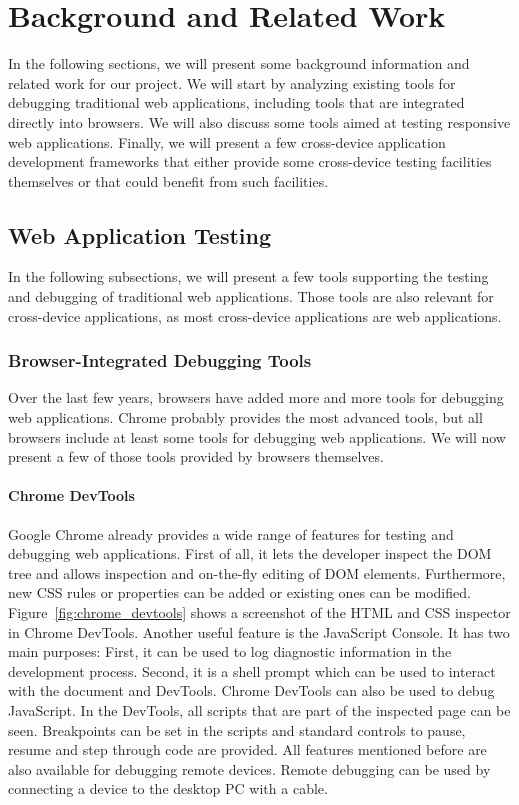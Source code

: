 \chapter{Background and Related Work}

In the following sections, we will present some background information and related work for our project. We will start by analyzing existing tools for debugging traditional web applications, including tools that are integrated directly into browsers. We will also discuss some tools aimed at testing responsive web applications. Finally, we will present a few cross-device application development frameworks that either provide some cross-device testing facilities themselves or that could benefit from such facilities.

\section{Web Application Testing}

In the following subsections, we will present a few tools supporting the testing and debugging of traditional web applications. Those tools are also relevant for cross-device applications, as most cross-device applications are web applications.

\subsection{Browser-Integrated Debugging Tools}

Over the last few years, browsers have added more and more tools for debugging web applications. Chrome probably provides the most advanced tools, but all browsers include at least some tools for debugging web applications. We will now present a few of those tools provided by browsers themselves.

\subsubsection{Chrome DevTools}

Google Chrome already provides a wide range of features for testing and debugging web applications. First of all, it lets the developer inspect the DOM tree and allows inspection and on-the-fly editing of DOM elements. Furthermore, new CSS rules or properties can be added or existing ones can be modified. Figure~\ref{fig:chrome_devtools} shows a screenshot of the HTML and CSS inspector in Chrome DevTools. Another useful feature is the JavaScript Console. It has two main purposes: First, it can be used to log diagnostic information in the development process. Second, it is a shell prompt which can be used to interact with the document and DevTools. Chrome DevTools can also be used to debug JavaScript. In the DevTools, all scripts that are part of the inspected page can be seen. Breakpoints can be set in the scripts and standard controls to pause, resume and step through code are provided. All features mentioned before are also available for debugging remote devices. Remote debugging can be used by connecting a device to the desktop PC with a cable.

